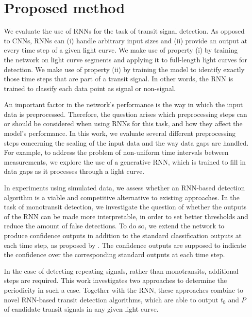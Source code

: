 
\section{Proposed method}
\label{sec:proposed}

We evaluate the use of RNNs for the task of transit signal detection. As opposed to CNNs, RNNs can (i) handle arbitrary input sizes and (ii) provide an output at every time step of a given light curve. We make use of property (i) by training the network on light curve segments and applying it to full-length light curves for detection. We make use of property (ii) by training the model to identify exactly those time steps that are part of a transit signal. In other words, the RNN is trained to classify each data point as signal or non-signal.

An important factor in the network's performance is the way in which the input data is preprocessed. Therefore, the question arises which preprocessing steps can or should be considered when using RNNs for this task, and how they affect the model’s performance. In this work, we evaluate several different preprocessing steps concerning the scaling of the input data and the way data gaps are handled. For example, to address the problem of non-uniform time intervals between measurements, we explore the use of a generative RNN, which is trained to fill in data gaps as it processes through a light curve. 

In experiments using simulated data, we assess whether an RNN-based detection algorithm is a viable and competitive alternative to existing approaches. In the task of monotransit detection, we investigate the question of whether the outputs of the RNN can be made more interpretable, in order to set better thresholds and reduce the amount of false detections. 
To do so, we extend the network to produce confidence outputs in addition to the standard classification outputs at each time step, as proposed by \cite{devries2018learning}. 
The confidence outputs are supposed to indicate the confidence over the corresponding standard outputs at each time step.

In the case of detecting repeating signals, rather than monotransits, additional steps are required. This work investigates two approaches to determine the periodicity in such a case. Together with the RNN, these approaches combine to novel RNN-based transit detection algorithms, which are able to output $t_0$ and $P$ of candidate transit signals in any given light curve.

